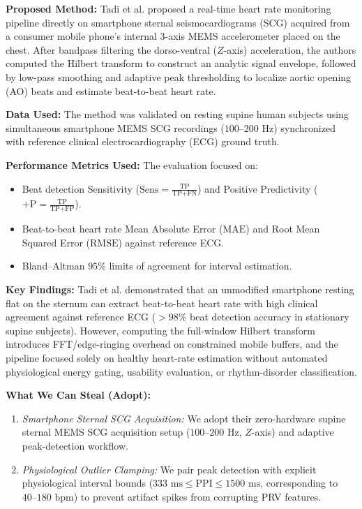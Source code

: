 \textbf{Proposed Method:} Tadi et al. \cite{tadi2016realtime} proposed a real-time heart rate monitoring pipeline directly on smartphone sternal seismocardiograms (SCG) acquired from a consumer mobile phone's internal 3-axis MEMS accelerometer placed on the chest. After bandpass filtering the dorso-ventral ($Z$-axis) acceleration, the authors computed the Hilbert transform to construct an analytic signal envelope, followed by low-pass smoothing and adaptive peak thresholding to localize aortic opening (AO) beats and estimate beat-to-beat heart rate.

\textbf{Data Used:} The method was validated on resting supine human subjects using simultaneous smartphone MEMS SCG recordings ($100\text{--}200\text{ Hz}$) synchronized with reference clinical electrocardiography (ECG) ground truth.

\textbf{Performance Metrics Used:} The evaluation focused on:
\begin{itemize}
    \item Beat detection Sensitivity ($\text{Sens} = \frac{\text{TP}}{\text{TP} + \text{FN}}$) and Positive Predictivity ($+\text{P} = \frac{\text{TP}}{\text{TP} + \text{FP}}$).
    \item Beat-to-beat heart rate Mean Absolute Error ($\text{MAE}$) and Root Mean Squared Error ($\text{RMSE}$) against reference ECG.
    \item Bland--Altman $95\%$ limits of agreement for interval estimation.
\end{itemize}

\textbf{Key Findings:} Tadi et al. demonstrated that an unmodified smartphone resting flat on the sternum can extract beat-to-beat heart rate with high clinical agreement against reference ECG ($> 98\%$ beat detection accuracy in stationary supine subjects). However, computing the full-window Hilbert transform introduces FFT/edge-ringing overhead on constrained mobile buffers, and the pipeline focused solely on healthy heart-rate estimation without automated physiological energy gating, usability evaluation, or rhythm-disorder classification.

\textbf{What We Can Steal (Adopt):}
\begin{enumerate}
    \item \textit{Smartphone Sternal SCG Acquisition:} We adopt their zero-hardware supine sternal MEMS SCG acquisition setup ($100\text{--}200\text{ Hz}$, $Z$-axis) and adaptive peak-detection workflow.
    \item \textit{Physiological Outlier Clamping:} We pair peak detection with explicit physiological interval bounds ($333\text{ ms} \le \text{PPI} \le 1500\text{ ms}$, corresponding to $40\text{--}180\text{ bpm}$) to prevent artifact spikes from corrupting PRV features.
\end{enumerate}

